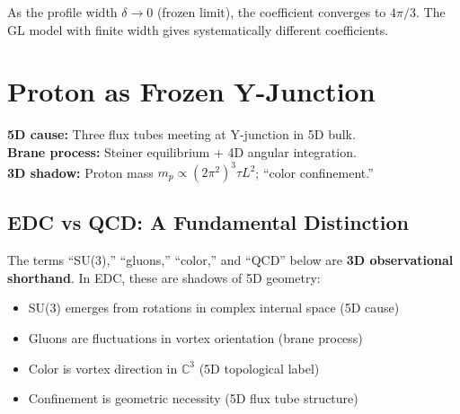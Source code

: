As the profile width $\delta \to 0$ (frozen limit), the coefficient converges to $4\pi/3$.
The GL model with finite width gives systematically different coefficients.


\section{Proton as Frozen Y-Junction}
\label{sec:ch2_proton}

\begin{tcolorbox}[colback=gray!5!white, colframe=gray!50!black,
    title=\textbf{5D Cause → 3D Shadow}]
\textbf{5D cause:} Three flux tubes meeting at Y-junction in 5D bulk.\\
\textbf{Brane process:} Steiner equilibrium + 4D angular integration.\\
\textbf{3D shadow:} Proton mass $m_p \propto (2\pi^2)^3 \tau L^2$; ``color confinement.''
\end{tcolorbox}

\subsection{EDC vs QCD: A Fundamental Distinction}

\begin{tcolorbox}[colback=cyan!5!white, colframe=cyan!50!black,
    title=\textbf{Framework 2.0 Clarification}]
The terms ``SU(3),'' ``gluons,'' ``color,'' and ``QCD'' below are \textbf{3D observational
shorthand}. In EDC, these are shadows of 5D geometry:
\begin{itemize}[nosep]
    \item SU(3) emerges from rotations in complex internal space (5D cause)
    \item Gluons are fluctuations in vortex orientation (brane process)
    \item Color is vortex direction in $\mathbb{C}^3$ (5D topological label)
    \item Confinement is geometric necessity (5D flux tube structure)
\end{itemize}
\end{tcolorbox}

